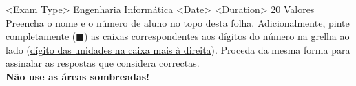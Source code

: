 \documentclass{informatics}
\begin{document}
% 

\begin{examcopy}[5]

  \AMCformBegin

    {<Exam Type>}
    {Engenharia Informática}
    {<Date>}
    {<Duration>}
    {20 Valores}
    {Preencha o nome e o número de aluno no topo desta folha. Adicionalmente,
    \underline{pinte completamente} ($\blacksquare$) as caixas
    correspondentes aos dígitos do número na grelha ao lado (\underline{dígito das
    unidades na caixa mais à direita}). Proceda da mesma forma para assinalar
  as respostas que considera correctas. 
  \\ \textbf{Não use as áreas sombreadas!}}

  \AMCform

  \setcounter{groupCounter}{0}
  



\end{examcopy}
\end{document}
